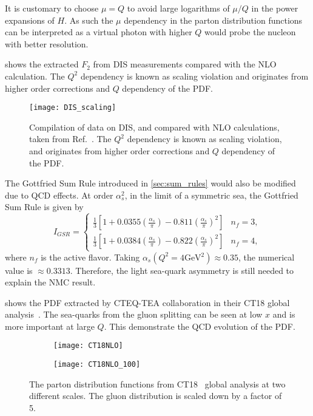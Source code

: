 \documentclass[../main.tex]{subfiles}
\begin{document}
It is customary to choose $\mu =Q$ to avoid large logarithms of $\mu /Q$ in the
power expansions of $H$. As such the $\mu$ dependency in the parton distribution
functions can be interpreted as a virtual photon with higher $Q$ would probe the
nucleon with better resolution.

 shows the extracted $F_2$ from DIS measurements compared
with the NLO calculation. The $Q^2$ dependency is known as scaling violation and
originates from higher order corrections and $Q$ dependency of the PDF.
\begin{figure}[h!]
	\centering
	\texttt{[image: DIS\_scaling]}
	\caption{
		Compilation of data on DIS, and compared with NLO calculations,
		taken from Ref.~\cite{adloff2003}.
		The $Q^2$ dependency is known as scaling violation,
		and originates from higher order corrections and $Q$ dependency of the PDF.
	}
	\label{fig:DIS_scaling}
\end{figure}
The Gottfried Sum Rule introduced in \cref{sec:sum_rules} would also be modified due to
QCD effects. At order $\alpha_s^2$, in the limit of a symmetric sea, the Gottfried Sum Rule
is given by~\cite{kataev2003}
\begin{equation}
	I_{GSR} = \begin{cases}
		\frac{1}{3}\left[ 1 + 0.0355\left(\frac{\alpha_s}{\pi}\right)-0.811\left(\frac{\alpha_s}{\pi}\right)^2 \right] & n_f=3, \\
		\frac{1}{3}\left[ 1 + 0.0384\left(\frac{\alpha_s}{\pi}\right)-0.822\left(\frac{\alpha_s}{\pi}\right)^2 \right] & n_f=4,
	\end{cases}
\end{equation}
where $n_f$ is the active flavor.
Taking $\alpha_s(Q^2=4\unit{\GeV^2})\approx 0.35$, the numerical value is $\approx 0.3313$. Therefore,
the light sea-quark asymmetry is still needed to explain the NMC result.

 shows the PDF extracted by CTEQ-TEA collaboration in their
CT18 global analysis~\cite{hou2021}. The sea-quarks from the gluon splitting
can be seen at low $x$ and is more important at large $Q$. This demonstrate the
QCD evolution of the PDF.

\begin{figure}
	\centering
	\begin{subfigure}{0.45\linewidth}
		\texttt{[image: CT18NLO]}
	\end{subfigure}
	\begin{subfigure}{0.45\linewidth}
		\texttt{[image: CT18NLO\_100]}
	\end{subfigure}
	\caption{The parton distribution functions from CT18~\cite{hou2021} global analysis at two different scales.
		The gluon distribution is scaled down by a factor of 5.}
	\label{fig:CT18_scale}
\end{figure}
\end{document}
